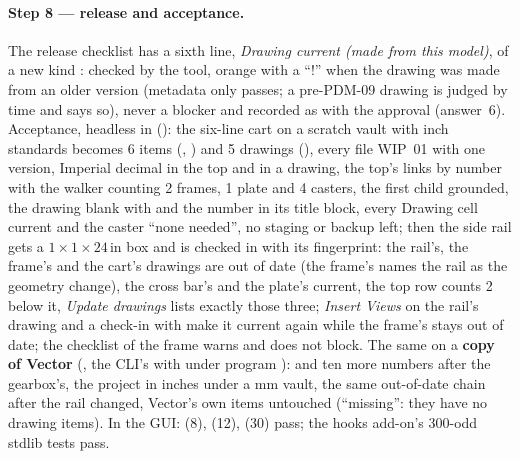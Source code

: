 \paragraph{Step 8 --- release and acceptance.} The release checklist has a sixth line, \emph{Drawing current (made
from this model)}, of a new kind : checked by the tool, orange with a ``!'' when the drawing was made from
an older version (metadata only passes; a pre-PDM-09 drawing is judged by time and says so), never a blocker and
recorded as  with the approval (answer~6). Acceptance, headless in 
(): the six-line cart on a scratch vault with inch standards becomes 6 items
(, ) and 5 drawings (), every file WIP~01 with one version, 
Imperial decimal in the top and in a drawing, the top's links by number with the walker counting 2 frames, 1 plate
and 4 casters, the first child grounded, the drawing blank with  and the number in its title block,
every Drawing cell current and the caster ``none needed'', no staging or backup left; then the side rail gets a
$1\times1\times24$\,in box and is checked in with its fingerprint: the rail's, the frame's and the cart's drawings are
out of date (the frame's names the rail as the geometry change), the cross bar's and the plate's current, the top row
counts 2 below it, \emph{Update drawings} lists exactly those three; \emph{Insert Views} on the rail's drawing and a
check-in with  make it current again while the frame's stays out of date; the checklist of the
frame warns and does not block. The same on a \textbf{copy of Vector} (, the CLI's
 with  under program ):  and ten more numbers
after the gearbox's, the project  in inches under a mm vault, the same out-of-date chain
after the rail changed, Vector's own items untouched (``missing'': they have no drawing items). In the GUI:
 (8),  (12),  (30) pass; the
hooks add-on's 300-odd stdlib tests pass.

